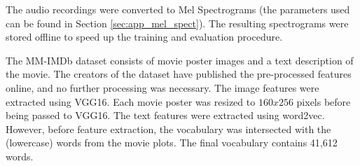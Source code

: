 The audio recordings were converted to Mel Spectrograms (the parameters used can be found in Section \ref{sec:app_mel_spect}). The resulting spectrograms were stored offline to speed up the training and evaluation procedure. 

The MM-IMDb dataset consists of movie poster images and a text description of the movie. The creators of the dataset have published the pre-processed features online, and no further processing was necessary. The image features were extracted using VGG16. Each movie poster was resized to $160x256$ pixels before being passed to VGG16. The text features were extracted using word2vec. However, before feature extraction, the vocabulary was intersected with the (lowercase) words from the movie plots. The final vocabulary contains 41,612 words.


